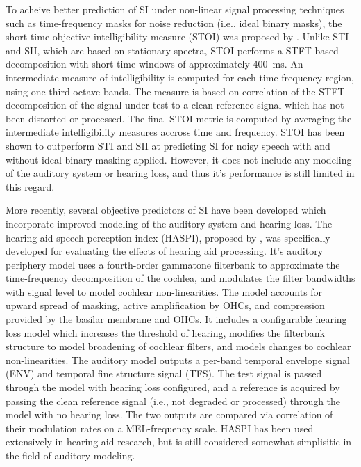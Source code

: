 To acheive better prediction of SI under non-linear signal processing techniques such as time-frequency masks for noise reduction (i.e., ideal binary masks), the short-time objective intelligibility measure (STOI) was proposed by \cite{taal2010short}. Unlike STI and SII, which are based on stationary spectra, STOI performs a STFT-based decomposition with short time windows of approximately \qty{400}{\milli\second}. An intermediate measure of intelligibility is computed for each time-frequency region, using one-third octave bands. The measure is based on correlation of the STFT decomposition of the signal under test to a clean reference signal which has not been distorted or processed. The final STOI metric is computed by averaging the intermediate intelligibility measures accross time and frequency. STOI has been shown to outperform STI and SII at predicting SI for noisy speech with and without ideal binary masking applied. However, it does not include any modeling of the auditory system or hearing loss, and thus it's performance is still limited in this regard.

More recently, several objective predictors of SI have been developed which incorporate improved modeling of the auditory system and hearing loss. The hearing aid speech perception index (HASPI), proposed by \cite{kates2022overview}, was specifically developed for evaluating the effects of hearing aid processing. It's auditory periphery model uses a fourth-order gammatone filterbank to approximate the time-frequency decomposition of the cochlea, and modulates the filter bandwidths with signal level to model cochlear non-linearities. The model accounts for upward spread of masking, active amplification by OHCs, and compression provided by the basilar membrane and OHCs. It includes a configurable hearing loss model which increases the threshold of hearing, modifies the filterbank structure to model broadening of cochlear filters, and models changes to cochlear non-linearities. The auditory model outputs a per-band temporal envelope signal (ENV) and temporal fine structure signal (TFS). The test signal is passed through the model with hearing loss configured, and a reference is acquired by passing the clean reference signal (i.e., not degraded or processed) through the model with no hearing loss. The two outputs are compared via correlation of their modulation rates on a MEL-frequency scale. HASPI has been used extensively in hearing aid research, but is still considered somewhat simplisitic in the field of auditory modeling.

